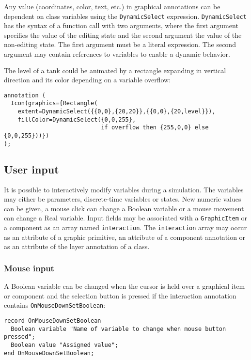 Any value (coordinates, color, text, etc.) in graphical annotations can
be dependent on class variables using the \lstinline!DynamicSelect! expression.
\lstinline!DynamicSelect! has the syntax of a function call with two arguments,
where the first argument specifies the value of the editing state and
the second argument the value of the non-editing state. The first
argument must be a literal expression. The second argument may contain
references to variables to enable a dynamic behavior.

\begin{example}
The level of a tank could be animated by a
rectangle expanding in vertical direction and its color depending on a
variable overflow:
\begin{lstlisting}[language=modelica]
annotation (
  Icon(graphics={Rectangle(
    extent=DynamicSelect({{0,0},{20,20}},{{0,0},{20,level}}),
    fillColor=DynamicSelect({0,0,255},
                            if overflow then {255,0,0} else {0,0,255}))})
);
\end{lstlisting}
\end{example}

\subsection{User input}\label{user-input}

It is possible to interactively modify variables during a simulation.
The variables may either be parameters, discrete-time variables or states.
New numeric values can be given, a mouse click can change a Boolean
variable or a mouse movement can change a Real variable. Input fields
may be associated with a \lstinline!GraphicItem! or a component as an array named
\lstinline!interaction!. The \lstinline!interaction! array may occur as an attribute of a
graphic primitive, an attribute of a component annotation or as an
attribute of the layer annotation of a class.

\subsubsection{Mouse input}\label{mouse-input}

A Boolean variable can be changed when the cursor is held over a
graphical item or component and the selection button is pressed if the
interaction annotation contains \lstinline!OnMouseDownSetBoolean!:
\begin{lstlisting}[language=modelica]
record OnMouseDownSetBoolean
  Boolean variable "Name of variable to change when mouse button pressed";
  Boolean value "Assigned value";
end OnMouseDownSetBoolean;
\end{lstlisting}

